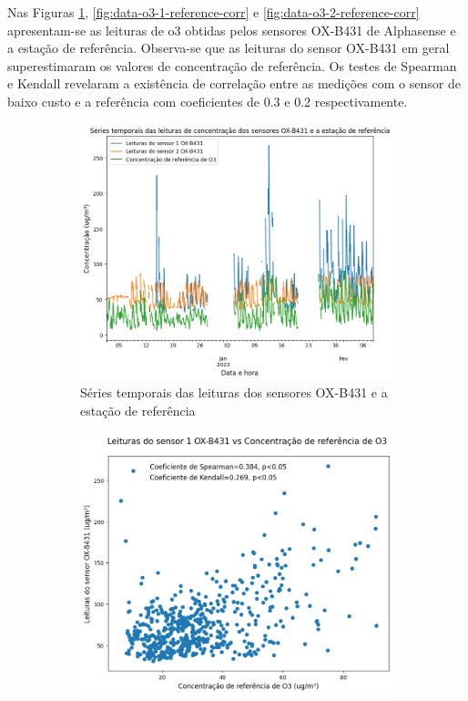Nas Figuras \ref{fig:data-o3-reference-time-series}, \ref{fig:data-o3-1-reference-corr} e \ref{fig:data-o3-2-reference-corr} apresentam-se as leituras de \acrshort{o3} obtidas pelos sensores OX-B431 de Alphasense e a estação de referência. Observa-se que as leituras do sensor OX-B431 em geral superestimaram os valores de concentração de referência. Os testes de Spearman e Kendall revelaram a existência de correlação entre as medições com o sensor de baixo custo e a referência com coeficientes de 0.3 e 0.2 respectivamente.

\begin{figure}[h]
    \centering
    \caption{Séries temporais e gráficos de dispersão das medições de \acrshort{o3}}
    \begin{subfigure}{0.99\textwidth}
        \includegraphics[width=\textwidth]{chapters/3-RESULTADOS CAMPO/Figuras/o3-b4-reference-time-series.png}
        \caption{Séries temporais das leituras dos sensores OX-B431 e a estação de referência}
        \label{fig:data-o3-reference-time-series}
    \end{subfigure}
    \hfill
    \begin{subfigure}{0.495\textwidth}
        \includegraphics[width=\textwidth]{chapters/3-RESULTADOS CAMPO/Figuras/o3-b4-1-reference-correlation.png}

\end{subfigure}
\end{figure}

